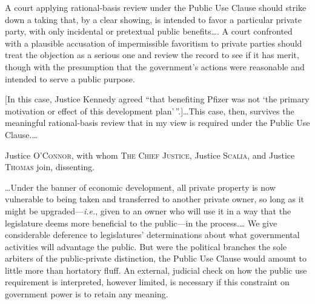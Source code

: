 A court applying rational-basis review under the Public Use Clause should strike
down a taking that, by a clear showing, is intended to favor a particular
private party, with only incidental or pretextual public benefits\ldots.
%
A court confronted with a plausible accusation of impermissible favoritism to
private parties should treat the objection as a serious one and review the
record to see if it has merit, though with the presumption that the government's
actions were reasonable and intended to serve a public purpose.

[In this case, Justice Kennedy
agreed ``that benefiting Pfizer was not `the primary motivation or effect of
this development plan'\,''.]\ldots This case, then, survives the meaningful
rational-basis review that in my view is required under the Public Use
Clause.\ldots


\opinion Justice O'\textsc{Connor}, with whom \textsc{The Chief Justice},
Justice \textsc{Scalia}, and Justice \textsc{Thomas} join, dissenting.

\ldots Under the banner of economic development, all private property is now
vulnerable to being taken and transferred to another private owner, so long as
it might be upgraded---\textit{i.e.}, given to an owner who will use it in a way
that the legislature deems more beneficial to the public---in the process.\ldots
%
We
give considerable deference to legislatures' determinations about what
governmental activities will advantage the public. But were the political
branches the sole arbiters of the public-private distinction, the Public Use
Clause would amount to little more than hortatory fluff. An external, judicial
check on how the public use requirement is interpreted, however limited, is
necessary if this constraint on government power is to retain any meaning. 

